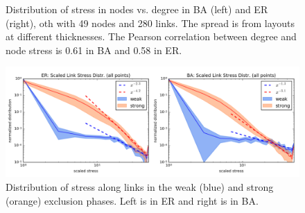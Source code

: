\documentclass[nofootinbib,preprint,floatfix,endfloats]{revtex4} %
\begin{document}
{\begin{figure}
    \caption{Distribution of stress in nodes vs. degree in BA (left) and ER (right), oth with 49 nodes and 280 links. The spread is from layouts at different thicknesses. The Pearson correlation between degree and node stress is 0.61 in BA and 0.58 in ER.}
    \label{fig:stress-k}
\end{figure}
\begin{figure}
    \centering
    \includegraphics[width=.8\columnwidth]{fig-09-19/stress-dist.png}
    \caption{Distribution of stress along links in the weak (blue) and strong (orange) exclusion phases. Left is in ER and right is in BA. }
    \label{fig:Tdist}
\end{figure}
} %
\end{document}
